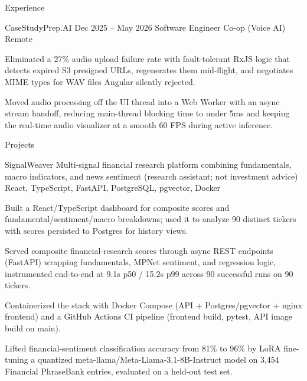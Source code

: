 \documentclass[
	11pt
]{../../../template}
\begin{document}
\begin{rSection}{E}{xperience}
		\begin{rSectionEntry}
			{CaseStudyPrep.AI}
			{Dec 2025 -- May 2026}
			{Software Engineer Co-op (Voice AI)}
			{}
			{Remote}

			\item Eliminated a 27\% audio upload failure rate with fault-tolerant RxJS logic that detects expired S3 presigned URLs, regenerates them mid-flight, and negotiates MIME types for WAV files Angular silently rejected.
			\item Moved audio processing off the UI thread into a Web Worker with an async stream handoff, reducing main-thread blocking time to under 5ms and keeping the real-time audio visualizer at a smooth 60 FPS during active inference.
		\end{rSectionEntry}
	\end{rSection}

	\begin{rSection}{P}{rojects}
		\begin{rSectionEntry}
			{SignalWeaver}
			{}
			{Multi-signal financial research platform combining fundamentals, macro indicators, and news sentiment (research assistant; not investment advice)}
			{React, TypeScript, FastAPI, PostgreSQL, pgvector, Docker}
			{}

			\item Built a React/TypeScript dashboard for composite scores and fundamental/sentiment/macro breakdowns; used it to analyze 90 distinct tickers with scores persisted to Postgres for history views.
			\item Served composite financial-research scores through async REST endpoints (FastAPI) wrapping fundamentals, MPNet sentiment, and regression logic, instrumented end-to-end at 9.1s p50 / 15.2s p99 across 90 successful runs on 90 tickers.
			\item Containerized the stack with Docker Compose (API + Postgres/pgvector + nginx frontend) and a GitHub Actions CI pipeline (frontend build, pytest, API image build on main).
			\item Lifted financial-sentiment classification accuracy from 81\% to 96\% by LoRA fine-tuning a quantized meta-llama/Meta-Llama-3.1-8B-Instruct model on 3,454 Financial PhraseBank entries, evaluated on a held-out test set.
		\end{rSectionEntry}
	\end{rSection}
\end{document}
